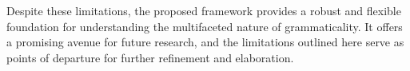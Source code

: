 \documentclass[12pt,letterpaper]{article}
\begin{document}

Despite these limitations, the proposed framework provides a robust and flexible foundation for understanding the multifaceted nature of grammaticality. It offers a promising avenue for future research, and the limitations outlined here serve as points of departure for further refinement and elaboration.





\end{document}
